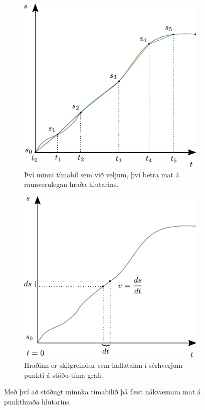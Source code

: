 \ifdefined \wholebook \else\documentclass[oneside]{book}\usepackage{EdlBook}\graphicspath{{figures/}}
\begin{document}
\begin{figure}[H]
    \centering
\begin{subfigure}[h]{.4\textwidth}
    \centering
    \includegraphics[width=\linewidth]{figures/stodutimagraf-skiptingar-linur.pdf}
    \caption{Því minni tímabil sem við veljum, því betra mat á raunverulegan hraða hlutarins.}
    \label{fig:st-skiptingar-medalhradi}
\end{subfigure}
\hfill
\begin{subfigure}[h]{.4\textwidth}
    \centering
    \includegraphics[width=\linewidth]{figures/stodutimagraf-orsmaed.pdf}
    \caption{Hraðinn er skilgreindur sem hallatalan í sérhverjum punkti á stöðu-tíma grafi.}
    \label{subfig:st-hradi}
\end{subfigure}
\caption{Með því að stöðugt minnka tímabilið þá fæst nákvæmara mat á punkthraða hlutarins.}
\end{figure}
\end{document}
